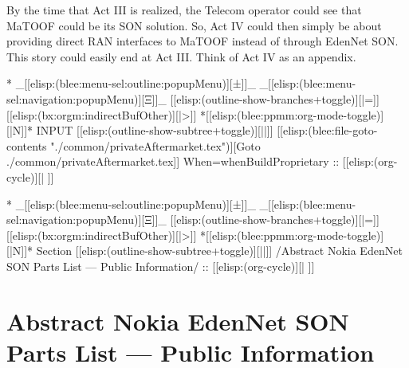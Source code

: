 \begin{verblatex}
\begin{frame}[fragile,plain,label=summary-2]
{  By the time that Act III is realized, the Telecom operator could see that MaTOOF could
  be its SON solution. So, Act IV could then simply be about providing direct RAN
  interfaces to MaTOOF instead of through EdenNet SON. This story could easily end at Act III.
  Think of Act IV as an appendix.

}

\end{frame}
\end{verblatex}


\begin{whenOrg}
*  _[[elisp:(blee:menu-sel:outline:popupMenu)][±]]_ _[[elisp:(blee:menu-sel:navigation:popupMenu)][Ξ]]_ [[elisp:(outline-show-branches+toggle)][|=]] [[elisp:(bx:orgm:indirectBufOther)][|>]] *[[elisp:(blee:ppmm:org-mode-toggle)][|N]]*  INPUT      [[elisp:(outline-show-subtree+toggle)][||]]   [[elisp:(blee:file-goto-contents "./common/privateAftermarket.tex")][Goto ./common/privateAftermarket.tex]] When=whenBuildProprietary ::  [[elisp:(org-cycle)][| ]]
\end{whenOrg}
\begin{whenBuildProprietary}

\end{whenBuildProprietary}



\begin{whenOrg}
*  _[[elisp:(blee:menu-sel:outline:popupMenu)][±]]_ _[[elisp:(blee:menu-sel:navigation:popupMenu)][Ξ]]_ [[elisp:(outline-show-branches+toggle)][|=]] [[elisp:(bx:orgm:indirectBufOther)][|>]] *[[elisp:(blee:ppmm:org-mode-toggle)][|N]]*  Section    [[elisp:(outline-show-subtree+toggle)][||]]   /Abstract Nokia EdenNet SON Parts List --- Public Information/ ::  [[elisp:(org-cycle)][| ]]
\end{whenOrg}

\section{Abstract Nokia EdenNet SON Parts List --- Public Information}

